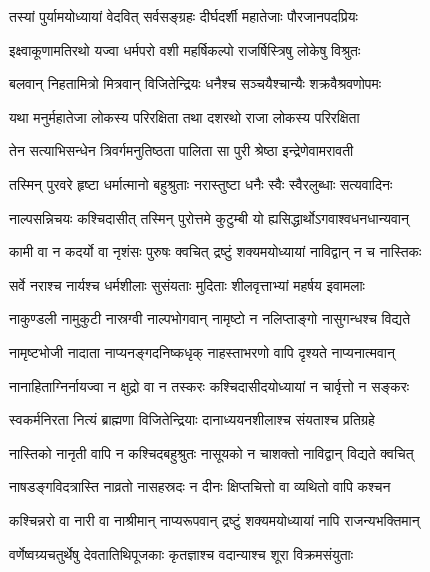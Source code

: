 
\twolineshloka
{तस्यां पुर्यामयोध्यायां वेदवित् सर्वसङ्ग्रहः}
{दीर्घदर्शी महातेजाः पौरजानपदप्रियः} %

\twolineshloka
{इक्ष्वाकूणामतिरथो यज्वा धर्मपरो वशी}
{महर्षिकल्पो राजर्षिस्त्रिषु लोकेषु विश्रुतः} %

\twolineshloka
{बलवान् निहतामित्रो मित्रवान् विजितेन्द्रियः}
{धनैश्च सञ्चयैश्चान्यैः शक्रवैश्रवणोपमः} %

\twolineshloka
{यथा मनुर्महातेजा लोकस्य परिरक्षिता}
{तथा दशरथो राजा लोकस्य परिरक्षिता} %

\twolineshloka
{तेन सत्याभिसन्धेन त्रिवर्गमनुतिष्ठता}
{पालिता सा पुरी श्रेष्ठा इन्द्रेणेवामरावती} %

\twolineshloka
{तस्मिन् पुरवरे हृष्टा धर्मात्मानो बहुश्रुताः}
{नरास्तुष्टा धनैः स्वैः स्वैरलुब्धाः सत्यवादिनः} %

\twolineshloka
{नाल्पसन्निचयः कश्चिदासीत् तस्मिन् पुरोत्तमे}
{कुटुम्बी यो ह्यसिद्धार्थोऽगवाश्वधनधान्यवान्} %

\twolineshloka
{कामी वा न कदर्यो वा नृशंसः पुरुषः क्वचित्}
{द्रष्टुं शक्यमयोध्यायां नाविद्वान् न च नास्तिकः} %

\twolineshloka
{सर्वे नराश्च नार्यश्च धर्मशीलाः सुसंयताः}
{मुदिताः शीलवृत्ताभ्यां महर्षय इवामलाः} %

\twolineshloka
{नाकुण्डली नामुकुटी नास्रग्वी नाल्पभोगवान्}
{नामृष्टो न नलिप्ताङ्गो नासुगन्धश्च विद्यते} %

\twolineshloka
{नामृष्टभोजी नादाता नाप्यनङ्गदनिष्कधृक्}
{नाहस्ताभरणो वापि दृश्यते नाप्यनात्मवान्} %

\twolineshloka
{नानाहिताग्निर्नायज्वा न क्षुद्रो वा न तस्करः}
{कश्चिदासीदयोध्यायां न चार्वृत्तो न सङ्करः} %

\twolineshloka
{स्वकर्मनिरता नित्यं ब्राह्मणा विजितेन्द्रियाः}
{दानाध्ययनशीलाश्च संयताश्च प्रतिग्रहे} %

\twolineshloka
{नास्तिको नानृती वापि न कश्चिदबहुश्रुतः}
{नासूयको न चाशक्तो नाविद्वान् विद्यते क्वचित्} %

\twolineshloka
{नाषडङ्गविदत्रास्ति नाव्रतो नासहस्रदः}
{न दीनः क्षिप्तचित्तो वा व्यथितो वापि कश्चन} %

\twolineshloka
{कश्चिन्नरो वा नारी वा नाश्रीमान् नाप्यरूपवान्}
{द्रष्टुं शक्यमयोध्यायां नापि राजन्यभक्तिमान्} %

\twolineshloka
{वर्णेष्वग्र्यचतुर्थेषु देवतातिथिपूजकाः}
{कृतज्ञाश्च वदान्याश्च शूरा विक्रमसंयुताः} %

